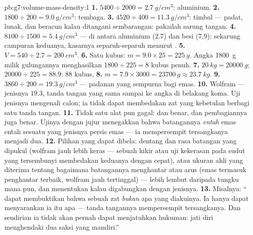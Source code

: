 \begin{solution}{pb:g7:volume-mass-density:1}
\textbf{1.} $5400 \div 2000 = \qty{2.7}{g/cm^3}$: aluminium.
\textbf{2.} $1800 \div 200 = \qty{9.0}{g/cm^3}$: tembaga.
\textbf{3.} $4520 \div 400 = \qty{11.3}{g/cm^3}$: timbal --- padat,
lunak, dan beracun kalau ditangani sembarangan: pakailah sarung
tangan.
\textbf{4.} $8100 \div 1500 = \qty{5.4}{g/cm^3}$ --- di antara
aluminium ($2.7$) dan besi ($7.9$): sekarung campuran keduanya,
kasarnya separuh-separuh menurut .
\textbf{5.} $V = 540 \div 2.7 = \qty{200}{cm^3}$.
\textbf{6.} Satu kubus: $m = 9.0 \times 25 = \qty{225}{g}$. Angka
\qty{1800}{g} milik gulungannya menghasilkan $1800 \div 225 = 8$ kubus
penuh.
\textbf{7.} $\qty{20}{kg} = \qty{20000}{g}$; $20000 \div 225 =
88.9$: $88$ kubus.
\textbf{8.} $m = 7.9 \times 3000 = \qty{23700}{g} \approx
\qty{23.7}{kg}$.
\textbf{9.} $3860 \div 200 = \qty{19.3}{g/cm^3}$ --- padanan yang
sempurna bagi emas.
\textbf{10.} Wolfram ---  jenisnya $19.3$, tanda tangan yang sama
sampai ke angka di belakang koma. Uji  jenisnya mengenali calon;
ia tidak dapat membedakan zat yang kebetulan berbagi satu tanda
tangan.
\textbf{11.} Tidak satu alat pun gagal:  dan  benar,
dan pembagiannya juga benar. Ujinya dengan jujur menegakkan bahwa
batangannya \emph{entah} emas entah sesuatu yang  jenisnya persis
 emas --- ia mempersempit tersangkanya menjadi dua.
\textbf{12.} Pilihan yang dapat dibela: dentang dan rasa batangan yang
dipukul (wolfram jauh lebih keras --- sebuah kikir atau uji kekerasan
pada sudut yang tersembunyi membedakan keduanya dengan cepat), atau
ukuran ahli yang diterima tentang bagaimana batangannya menghantar
 atau arus (emas termasuk penghantar terbaik, wolfram jauh
tertinggal) --- lebih lembut daripada tungku mana pun, dan menentukan
kalau digabungkan dengan  jenisnya.
\textbf{13.} Misalnya: `` dapat membuktikan bahwa sebuah
zat \emph{bukan} apa yang diakuinya. Ia hanya dapat menyarankan ia itu
apa --- tanda tangannya mempersempit tersangkanya. Dan sendirian ia
tidak akan pernah dapat menjatuhkan hukuman: jati diri menghendaki dua
saksi yang mandiri.''
\end{solution}
